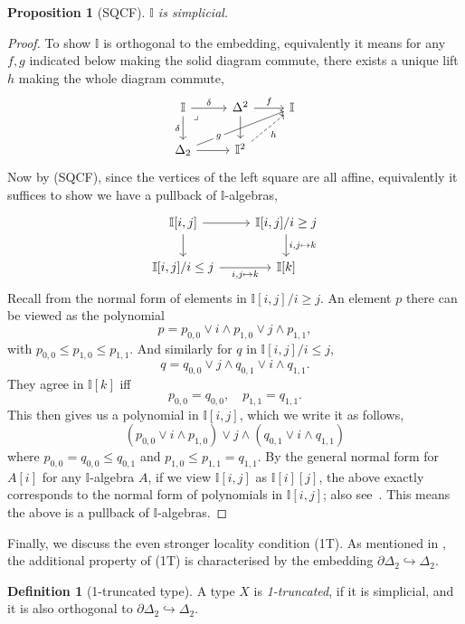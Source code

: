 \documentclass[12pt]{amsart}
\newtheorem{proposition}[theorem]{Proposition}
\theoremstyle{definition}
\newtheorem{definition}[theorem]{Definition}
\newcommand{\mbb}[1]{\mathbb{#1}}
\newcommand{\I}{\mbb I}
\newcommand{\hook}{\hookrightarrow}
\begin{document}
\begin{proposition}[SQCF]\label{specissimplicial}
  $\I$ is simplicial.
\end{proposition}
\begin{proof}
  To show $\I$ is orthogonal to the embedding, equivalently it means for any $f,g$ indicated below making the solid diagram commute, there exists a unique lift $h$ making the whole diagram commute,
  \[\begin{tikzcd}
    \I \ar[r, "\delta"] \ar[d, "\delta"'] & \Delta^2 \ar[r, "f"] \ar[d] & \I \\
    \Delta_2 \ar[urr, "g"{description, near start}] \ar[r] & \I^2 \ar[ur, dashed, "h"']
    \arrow["\lrcorner"{anchor=center, pos=0.125}, draw=none, from=1-1, to=2-2]
  \end{tikzcd}\]
  Now by (SQCF), since the vertices of the left square are all affine, equivalently it suffices to show we have a pullback of $\I$-algebras,
  \[\begin{tikzcd}
    {\I[i,j]} \ar[r] \ar[d] & {\I[i,j]/i \ge j} \ar[d, "{i,j \mapsto k}"] \\
    {\I[i,j]/i \le j} \ar[r, "{i,j\mapsto k}"'] & {\I[k]}
  \end{tikzcd}\]
  Recall from  the normal form of elements in $\I[i,j]/i\ge j$. An element $p$ there can be viewed as the polynomial 
  \[ p = p_{0,0} \vee i \wedge p_{1,0} \vee j \wedge p_{1,1}, \]
  with $p_{0,0} \le p_{1,0} \le p_{1,1}$. And similarly for $q$ in $\I[i,j]/i \le j$, 
  \[ q = q_{0,0} \vee j \wedge q_{0,1} \vee i \wedge q_{1,1}. \]
  They agree in $\I[k]$ iff 
  \[ p_{0,0} = q_{0,0}, \quad p_{1,1} = q_{1,1}. \]
  This then gives us a polynomial in $\I[i,j]$, which we write it as follows,
  \[ (p_{0,0} \vee i \wedge p_{1,0}) \vee j \wedge (q_{0,1} \vee i \wedge q_{1,1}) \]
  where $p_{0,0} = q_{0,0} \le q_{0,1}$ and $p_{1,0} \le p_{1,1} = q_{1,1}$. 
  By the general normal form for $A[i]$ for any $\I$-algebra $A$, if we view $\I[i,j]$ as $\I[i][j]$, the above exactly corresponds to the normal form of polynomials in $\I[i,j]$; also see~\cite[Thm. 10.21]{lausch2000algebra}. This means the above is a pullback of $\I$-algebras.
\end{proof}



Finally, we discuss the even stronger locality condition (1T). As mentioned in , the additional property of (1T) is characterised by the embedding $\partial\Delta_2 \hook \Delta_2$.

\begin{definition}[1-truncated type]
  A type $X$ is \emph{1-truncated}, if it is simplicial, and it is also orthogonal to $\partial\Delta_2 \hook \Delta_2$.
\end{definition}
\end{document}
